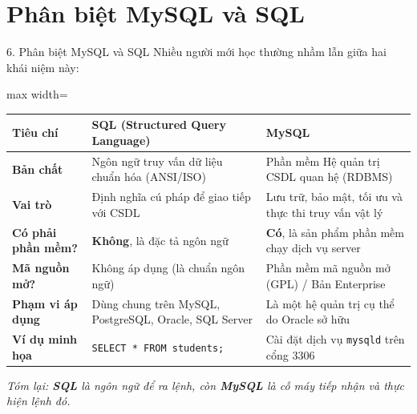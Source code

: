 \documentclass[aspectratio=169,11pt]{beamer}
\newcommand{\kw}[1]{\textcolor{dbblue}{\textbf{#1}}}
\newcommand{\smallgap}{\vspace{0.25em}}
\begin{document}
\section{Phân biệt MySQL và SQL}
\begin{frame}{6. Phân biệt MySQL và SQL}
Nhiều người mới học thường nhầm lẫn giữa hai khái niệm này:
\smallgap
\centering
\begin{adjustbox}{max width=\textwidth}
\scriptsize
\begin{tabular}{p{2.8cm}p{5.8cm}p{5.8cm}}
\toprule
\textbf{Tiêu chí} & \textbf{SQL (Structured Query Language)} & \textbf{MySQL} \\
\midrule
\kw{Bản chất} & Ngôn ngữ truy vấn dữ liệu chuẩn hóa (ANSI/ISO) & Phần mềm Hệ quản trị CSDL quan hệ (RDBMS) \\
\kw{Vai trò} & Định nghĩa cú pháp để giao tiếp với CSDL & Lưu trữ, bảo mật, tối ưu và thực thi truy vấn vật lý \\
\kw{Có phải phần mềm?} & \textbf{Không}, là đặc tả ngôn ngữ & \textbf{Có}, là sản phẩm phần mềm chạy dịch vụ server \\
\kw{Mã nguồn mở?} & Không áp dụng (là chuẩn ngôn ngữ) & Phần mềm mã nguồn mở (GPL) / Bản Enterprise \\
\kw{Phạm vi áp dụng} & Dùng chung trên MySQL, PostgreSQL, Oracle, SQL Server & Là một hệ quản trị cụ thể do Oracle sở hữu \\
\kw{Ví dụ minh họa} & \texttt{SELECT * FROM students;} & Cài đặt dịch vụ \texttt{mysqld} trên cổng 3306 \\
\bottomrule
\end{tabular}
\end{adjustbox}

\smallgap
\textit{Tóm lại: \textbf{SQL} là ngôn ngữ để ra lệnh, còn \textbf{MySQL} là cỗ máy tiếp nhận và thực hiện lệnh đó.}
\end{frame}

\end{document}
